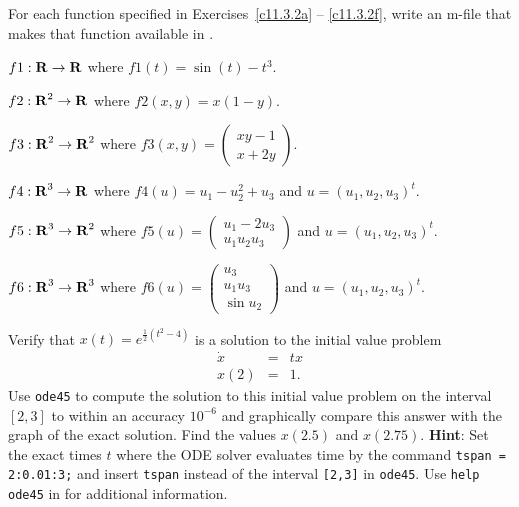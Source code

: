 \noindent For each function specified in Exercises~\ref{c11.3.2a} -- 
\ref{c11.3.2f}, write an m-file that makes that function available in 
\Matlabp.
\begin{exercise} \label{c11.3.2a}
$f1:\mbox{$\bf{R}$}\to\mbox{$\bf{R}$}$ where $f1(t)=\sin(t) - t^3$.
\end{exercise}
\begin{exercise} \label{c11.3.2b}
$f2:\mbox{$\bf{R}$}^2\to\mbox{$\bf{R}$}$ where $f2(x,y)=x(1-y)$.
\end{exercise}
\begin{exercise} \label{c11.3.2c}
$f3:\mbox{$\bf{R}$}^2\to\mbox{$\bf{R}$}^2$ where  
$f3(x,y)=\left(\begin{array}{c} xy-1\\x+2y\end{array}\right)$.
\end{exercise}
\begin{exercise} \label{c11.3.2d}
$f4:\mbox{$\bf{R}$}^3\to\mbox{$\bf{R}$}$ where $f4(u)=u_1-u_2^2 + u_3$ and $u=(u_1,u_2,u_3)^t$.
\end{exercise}
\begin{exercise} \label{c11.3.2e}
$f5:\mbox{$\bf{R}$}^3\to\mbox{$\bf{R}$}^2$ where $f5(u)=\left(\begin{array}{c} u_1 -2u_3\\u_1 u_2 u_3\end{array}\right)$ and $u=(u_1,u_2,u_3)^t$.
\end{exercise}
\begin{exercise} \label{c11.3.2f}
$f6:\mbox{$\bf{R}$}^3\to\mbox{$\bf{R}$}^3$ where $f6(u)=\left(\begin{array}{c} u_3\\u_1 u_3\\ 
\sin u_2\end{array}\right)$ and $u=(u_1,u_2,u_3)^t$.
\end{exercise}

\begin{exercise} \label{c11.3.2A}
Verify that $x(t) = e^{\frac{1}{2}(t^2-4)}$ is a solution to the initial 
value problem
\[
\begin{array}{rcl}
\dot{x} & = & tx \\
x(2) & = & 1.
\end{array}
\]
Use {\tt ode45} to compute the solution to this initial value problem on the
interval $[2,3]$ to within an accuracy $10^{-6}$ and graphically compare this 
answer with the graph of the exact solution.  Find the values $x(2.5)$ and
$x(2.75)$.  {\bf Hint}: Set the exact times $t$ where the ODE solver 
evaluates time by the command {\tt tspan = 2:0.01:3;} and insert {\tt tspan}
instead of the interval {\tt [2,3]} in {\tt ode45}.  Use {\tt help ode45} in 
\Matlab for additional information. 
\end{exercise}

